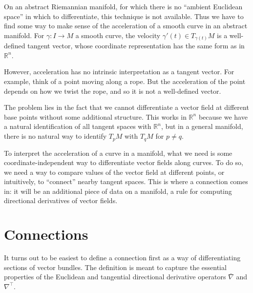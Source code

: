 \documentclass[../main.tex]{subfiles}
\begin{document}
On an abstract Riemannian manifold, for which there is no ``ambient Euclidean space'' in which to differentiate, this technique is not available. Thus we have to find some way to make sense of the acceleration of a smooth curve in an abstract manifold. For $\gamma: I \to M$ a smooth curve, the velocity $\gamma'(t) \in T_{\gamma(t)} M$ is a well-defined tangent vector, whose coordinate representation has the same form as in $\mathbb{R}^n$.

However, acceleration has no intrinsic interpretation as a tangent vector. For example, think of a point moving along a rope. But the acceleration of the point depends on how we twist the rope, and so it is not a well-defined vector.

The problem lies in the fact that we cannot differentiate a vector field at different base points without some additional structure. This works in $\mathbb{R}^n$ because we have a natural identification of all tangent spaces with $\mathbb{R}^n$, but in a general manifold, there is no natural way to identify $T_p M$ with $T_q M$ for $p \neq q$.

\begin{remark}
	To interpret the acceleration of a curve in a manifold, what we need is some coordinate-independent way to differentiate vector fields along curves. To do so, we need a way to compare values of the vector field at different points, or intuitively, to ``connect'' nearby tangent spaces. This is where a connection comes in: it will be an additional piece of data on a manifold, a rule for computing directional derivatives of vector fields.
\end{remark}

\section{Connections}
It turns out to be easiest to define a connection first as a way of differentiating sections of vector bundles. The definition is meant to capture the essential properties of the Euclidean and tangential directional derivative operators $\bar{\nabla}$ and $\nabla^{\top}$.
\end{document}
